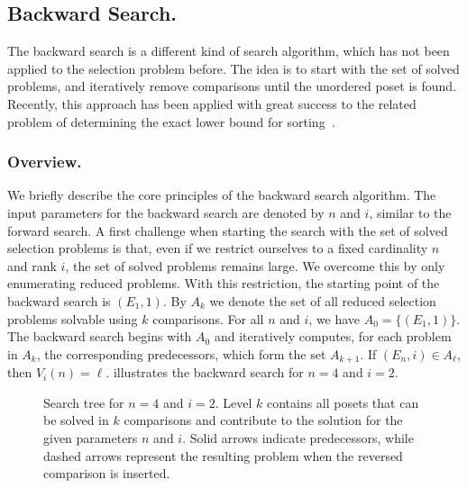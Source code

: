 \documentclass[a4paper,UKenglish,cleveref, autoref, thm-restate, anonymous]{lipics-v2021}
\begin{document}
\subsection{Backward Search.} \label{sec:backward}
The backward search is a different kind of search algorithm, which has not been applied to the selection problem before.
The idea is to start with the set of solved problems, and iteratively remove comparisons until the unordered poset is found.
Recently, this approach has been applied with great success to the related problem of determining the exact lower bound for sorting~\cite{stober2022lower}.

\subsubsection{Overview.} \label{sec:backward:algorithm}
We briefly describe the core principles of the backward search algorithm.
The input parameters for the backward search are denoted by $n$ and $i$, similar to the forward search.
A first challenge when starting the search with the set of solved selection problems is that, even if we restrict ourselves to a fixed cardinality $n$ and rank $i$, the set of solved problems remains large.
We overcome this by only enumerating reduced problems.
With this restriction, the starting point of the backward search is $(E_1, 1)$.
By $A_k$ we denote the set of all reduced selection problems solvable using $k$ comparisons.
For all $n$ and $i$, we have $A_0 = \{(E_1, 1)\}$.
The backward search begins with $A_0$ and iteratively computes, for each problem in $A_k$, the corresponding predecessors, which form the set $A_{k + 1}$.
If $(E_n, i) \in A_\ell$, then $V_i(n) = \ell$.
 illustrates the backward search for $n = 4$ and $i = 2$.

\begin{figure}[t]
  \centering
  
  \caption{Search tree for $n = 4$ and $i = 2$.
    Level $k$ contains all posets that can be solved in $k$ comparisons and contribute to the solution for the given parameters $n$ and $i$.
    Solid arrows indicate predecessors, while dashed arrows represent the resulting problem when the reversed comparison is inserted.}
  \label{fig:backward-search-tree}
\end{figure}
\end{document}
